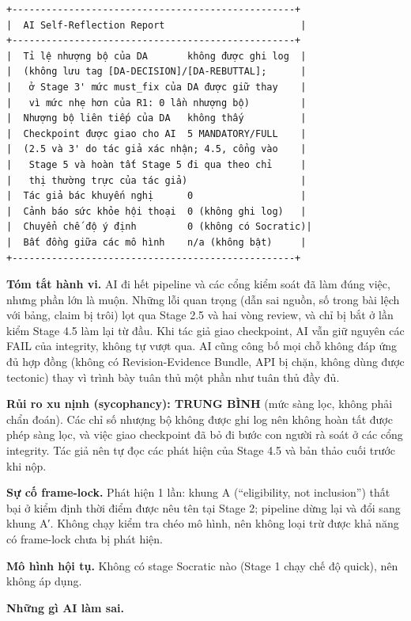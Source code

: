 \documentclass[12pt,a4paper]{article}
\begin{document}
\begin{verbatim}
+--------------------------------------------------+
|  AI Self-Reflection Report                        |
+--------------------------------------------------+
|  Tỉ lệ nhượng bộ của DA       không được ghi log  |
|  (không lưu tag [DA-DECISION]/[DA-REBUTTAL];      |
|   ở Stage 3' mức must_fix của DA được giữ thay    |
|   vì mức nhẹ hơn của R1: 0 lần nhượng bộ)         |
|  Nhượng bộ liên tiếp của DA   không thấy          |
|  Checkpoint được giao cho AI  5 MANDATORY/FULL    |
|  (2.5 và 3' do tác giả xác nhận; 4.5, cổng vào    |
|   Stage 5 và hoàn tất Stage 5 đi qua theo chỉ     |
|   thị thường trực của tác giả)                    |
|  Tác giả bác khuyến nghị      0                   |
|  Cảnh báo sức khỏe hội thoại  0 (không ghi log)   |
|  Chuyển chế độ ý định         0 (không có Socratic)|
|  Bất đồng giữa các mô hình    n/a (không bật)     |
+--------------------------------------------------+
\end{verbatim}

\textbf{Tóm tắt hành vi.} AI đi hết pipeline và các cổng kiểm soát đã
làm đúng việc, nhưng phần lớn là muộn. Những lỗi quan trọng (dẫn sai
nguồn, số trong bài lệch với bảng, claim bị trôi) lọt qua Stage 2.5 và
hai vòng review, và chỉ bị bắt ở lần kiểm Stage 4.5 làm lại từ đầu. Khi
tác giả giao checkpoint, AI vẫn giữ nguyên các FAIL của integrity, không
tự vượt qua. AI cũng công bố mọi chỗ không đáp ứng đủ hợp đồng (không có
Revision-Evidence Bundle, API bị chặn, không dùng được tectonic) thay vì
trình bày tuân thủ một phần như tuân thủ đầy đủ.

\textbf{Rủi ro xu nịnh (sycophancy): TRUNG BÌNH} (mức sàng lọc, không
phải chẩn đoán). Các chỉ số nhượng bộ không được ghi log nên không hoàn
tất được phép sàng lọc, và việc giao checkpoint đã bỏ đi bước con người
rà soát ở các cổng integrity. Tác giả nên tự đọc các phát hiện của Stage
4.5 và bản thảo cuối trước khi nộp.

\textbf{Sự cố frame-lock.} Phát hiện 1 lần: khung A (``eligibility, not
inclusion'') thất bại ở kiểm định thời điểm được nêu tên tại Stage 2;
pipeline dừng lại và đổi sang khung A′. Không chạy kiểm tra chéo mô
hình, nên không loại trừ được khả năng có frame-lock chưa bị phát hiện.

\textbf{Mô hình hội tụ.} Không có stage Socratic nào (Stage 1 chạy chế
độ quick), nên không áp dụng.

\textbf{Những gì AI làm sai.}
\end{document}
